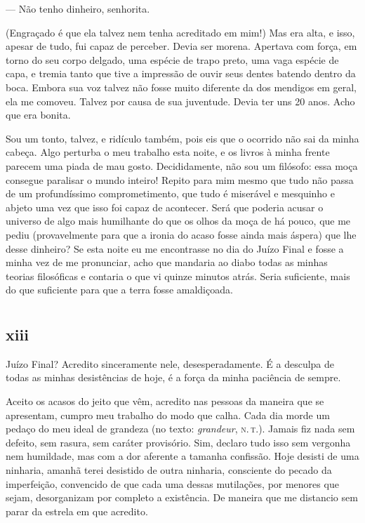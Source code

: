 --- Não tenho dinheiro, senhorita.

(Engraçado é que ela talvez nem tenha acreditado em mim!) Mas era alta,
e isso, apesar de tudo, fui capaz de perceber. Devia ser morena.
Apertava com força, em torno do seu corpo delgado, uma espécie de trapo
preto, uma vaga espécie de capa, e tremia tanto que tive a impressão de
ouvir seus dentes batendo dentro da boca. Embora sua voz talvez não
fosse muito diferente da dos mendigos em geral, ela me comoveu. Talvez
por causa de sua juventude. Devia ter uns 20 anos. Acho que era bonita.

Sou um tonto, talvez, e ridículo também, pois eis que o ocorrido não sai
da minha cabeça. Algo perturba o meu trabalho esta noite, e os livros à
minha frente parecem uma piada de mau gosto. Decididamente, não sou um
filósofo: essa moça consegue paralisar o mundo inteiro! Repito para mim
mesmo que tudo não passa de um profundíssimo comprometimento, que tudo é
miserável e mesquinho e abjeto uma vez que isso foi capaz de acontecer.
Será que poderia acusar o universo de algo mais humilhante do que os
olhos da moça de há pouco, que me pediu (provavelmente para que a ironia
do acaso fosse ainda mais áspera) que lhe desse dinheiro? Se esta
noite eu me encontrasse no dia do Juízo Final e fosse a minha vez de me
pronunciar, acho que mandaria ao diabo todas as minhas teorias
filosóficas e contaria o que vi quinze minutos atrás. Seria suficiente,
mais do que suficiente para que a terra fosse amaldiçoada.



\chapter*{}
\section{xiii}

\noindent{}Juízo Final? Acredito sinceramente nele, desesperadamente. É a desculpa
de todas as minhas desistências de hoje, é a força da minha paciência de
sempre.

Aceito os acasos do jeito que vêm, acredito nas pessoas da maneira que
se apresentam, cumpro meu trabalho do modo que calha. Cada dia morde um
pedaço do meu ideal de grandeza (no texto: \textit{grandeur}, \textsc{n.\,t.}).
Jamais fiz nada sem defeito, sem rasura, sem caráter provisório. Sim,
declaro tudo isso sem vergonha nem humildade, mas com a dor aferente a
tamanha confissão. Hoje desisti de uma ninharia, amanhã terei desistido
de outra ninharia, consciente do pecado da imperfeição, convencido de
que cada uma dessas mutilações, por menores que sejam, desorganizam por
completo a existência. De maneira que me distancio sem parar da estrela
em que acredito.

